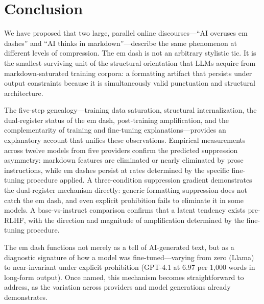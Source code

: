 \section{Conclusion}
\label{sec:conclusion}

We have proposed that two large, parallel online discourses---``AI overuses em dashes'' and ``AI thinks in markdown''---describe the same phenomenon at different levels of compression. The em dash is not an arbitrary stylistic tic. It is the smallest surviving unit of the structural orientation that LLMs acquire from markdown-saturated training corpora: a formatting artifact that persists under output constraints because it is simultaneously valid punctuation and structural architecture.

The five-step genealogy---training data saturation, structural internalization, the dual-register status of the em dash, post-training amplification, and the complementarity of training and fine-tuning explanations---provides an explanatory account that unifies these observations. Empirical measurements across twelve models from five providers confirm the predicted suppression asymmetry: markdown features are eliminated or nearly eliminated by prose instructions, while em dashes persist at rates determined by the specific fine-tuning procedure applied. A three-condition suppression gradient demonstrates the dual-register mechanism directly: generic formatting suppression does not catch the em dash, and even explicit prohibition fails to eliminate it in some models. A base-vs-instruct comparison confirms that a latent tendency exists pre-RLHF, with the direction and magnitude of amplification determined by the fine-tuning procedure.

The em dash functions not merely as a tell of AI-generated text, but as a diagnostic signature of how a model was fine-tuned---varying from zero (Llama) to near-invariant under explicit prohibition (GPT-4.1 at 6.97 per 1,000 words in long-form output). Once named, this mechanism becomes straightforward to address, as the variation across providers and model generations already demonstrates.
